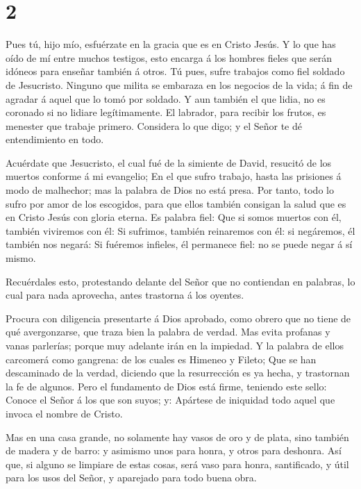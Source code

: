 \hypertarget{section-1}{%
\section{2}\label{section-1}}

 Pues tú, hijo mío, esfuérzate en la gracia que es en Cristo
Jesús.  Y lo que has oído de mí entre muchos testigos, esto
encarga á los hombres fieles que serán idóneos para enseñar también á
otros.  Tú pues, sufre trabajos como fiel soldado de
Jesucristo.  Ninguno que milita se embaraza en los negocios
de la vida; á fin de agradar á aquel que lo tomó por soldado.
 Y aun también el que lidia, no es coronado si no lidiare
legítimamente.  El labrador, para recibir los frutos, es
menester que trabaje primero.  Considera lo que digo; y el
Señor te dé entendimiento en todo.

 Acuérdate que Jesucristo, el cual fué de la simiente de
David, resucitó de los muertos conforme á mi evangelio;  En
el que sufro trabajo, hasta las prisiones á modo de malhechor; mas la
palabra de Dios no está presa.  Por tanto, todo lo sufro
por amor de los escogidos, para que ellos también consigan la salud que
es en Cristo Jesús con gloria eterna.  Es palabra fiel: Que
si somos muertos con él, también viviremos con él:  Si
sufrimos, también reinaremos con él: si negáremos, él también nos
negará:  Si fuéremos infieles, él permanece fiel: no se
puede negar á sí mismo.

 Recuérdales esto, protestando delante del Señor que no
contiendan en palabras, lo cual para nada aprovecha, antes trastorna á
los oyentes.

 Procura con diligencia presentarte á Dios aprobado, como
obrero que no tiene de qué avergonzarse, que traza bien la palabra de
verdad.  Mas evita profanas y vanas parlerías; porque muy
adelante irán en la impiedad.  Y la palabra de ellos
carcomerá como gangrena: de los cuales es Himeneo y Fileto;
 Que se han descaminado de la verdad, diciendo que la
resurrección es ya hecha, y trastornan la fe de algunos. 
Pero el fundamento de Dios está firme, teniendo este sello: Conoce el
Señor á los que son suyos; y: Apártese de iniquidad todo aquel que
invoca el nombre de Cristo.

 Mas en una casa grande, no solamente hay vasos de oro y de
plata, sino también de madera y de barro: y asimismo unos para honra, y
otros para deshonra.  Así que, si alguno se limpiare de
estas cosas, será vaso para honra, santificado, y útil para los usos del
Señor, y aparejado para todo buena obra.

